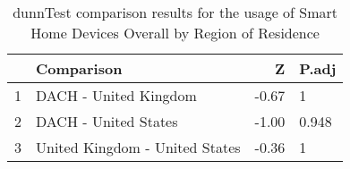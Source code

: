\begin{table}[ht]
\centering
\begin{tabular}{rlrl}
  \hline
 & Comparison & Z & P.adj \\ 
  \hline
1 & DACH - United Kingdom & -0.67 & 1   \\ 
  2 & DACH - United States & -1.00 & 0.948   \\ 
  3 & United Kingdom - United States & -0.36 & 1   \\ 
   \hline
\end{tabular}
\caption{dunnTest comparison results for the usage of Smart Home Devices Overall by Region of Residence} 
\label{RQ2_H2_UsageRegion}
\end{table}
